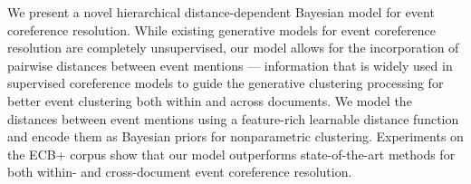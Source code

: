 We present a novel hierarchical distance-dependent Bayesian model for event coreference resolution. While existing generative models for event coreference resolution are completely unsupervised, our model allows for the incorporation of pairwise distances between event mentions — information that is widely used in supervised coreference models to guide the generative clustering processing for better event clustering both within and across documents. We model the distances between event mentions using a feature-rich learnable distance function and encode them as Bayesian priors for nonparametric clustering. Experiments on the ECB+ corpus show that our model outperforms state-of-the-art methods for both within- and cross-document event coreference resolution.